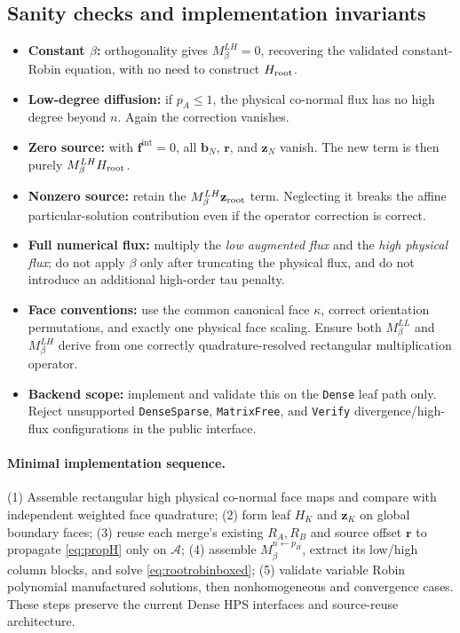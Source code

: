 \documentclass[11pt,letterpaper]{article}
\newcommand{\fint}{\mathbf f^{\mathrm{int}}}
\newcommand{\bb}{\mathbf b}
\newcommand{\zz}{\mathbf z}
\begin{document}
\subsection*{Sanity checks and implementation invariants}
\begin{itemize}
\item \textbf{Constant \(\beta\):} orthogonality gives \(M_\beta^{LH}=0\), recovering the validated constant-Robin equation, with no need to construct \(H_{\rm root}\).
\item \textbf{Low-degree diffusion:} if \(p_A\le1\), the physical co-normal flux has no high degree beyond \(n\). Again the correction vanishes.
\item \textbf{Zero source:} with \(\fint=0\), all \(\bb_N\), \(\mathbf r\), and \(\zz_N\) vanish. The new term is then purely \(M_\beta^{LH}H_{\rm root}\).
\item \textbf{Nonzero source:} retain the \(M_\beta^{LH}\zz_{\rm root}\) term. Neglecting it breaks the affine particular-solution contribution even if the operator correction is correct.
\item \textbf{Full numerical flux:} multiply the \emph{low augmented flux} and the \emph{high physical flux}; do not apply \(\beta\) only after truncating the physical flux, and do not introduce an additional high-order tau penalty.
\item \textbf{Face conventions:} use the common canonical face \(\kappa\), correct orientation permutations, and exactly one physical face scaling. Ensure both \(M_\beta^{LL}\) and \(M_\beta^{LH}\) derive from one correctly quadrature-resolved rectangular multiplication operator.
\item \textbf{Backend scope:} implement and validate this on the \texttt{Dense} leaf path only. Reject unsupported \texttt{DenseSparse}, \texttt{MatrixFree}, and \texttt{Verify} divergence/high-flux configurations in the public interface.
\end{itemize}

\paragraph{Minimal implementation sequence.}
(1) Assemble rectangular high physical co-normal face maps and compare with independent weighted face quadrature; (2) form leaf \(H_K\) and \(\zz_K\) on global boundary faces; (3) reuse each merge's existing \(R_A,R_B\) and source offset \(\mathbf r\) to propagate \eqref{eq:propH} only on \(\mathcal A\); (4) assemble \(M_\beta^{n\leftarrow p_H}\), extract its low/high column blocks, and solve \eqref{eq:rootrobinboxed}; (5) validate variable Robin polynomial manufactured solutions, then nonhomogeneous and convergence cases. These steps preserve the current Dense HPS interfaces and source-reuse architecture.
\end{document}
